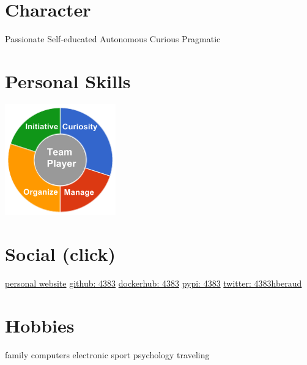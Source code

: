 \documentclass[]{friggeri-cv}
\begin{document}
\begin{aside}
~
~
~
    \section{Character}
        Passionate
        Self-educated
        Autonomous
        Curious
        Pragmatic
        ~
    \section{Personal Skills}
        \includegraphics[scale=0.62]{img/personal.png}
        ~
    \section{Social (click)}
        \href{http://herve.beraud.ovh/}{personal website}
        \href{https://github.com/4383}{github: 4383}
        \href{https://hub.docker.com/r/4383}{dockerhub: 4383}
        \href{https://warehouse.python.org/user/4383/}{pypi: 4383}
        \href{https://twitter.com/4383hberaud}{twitter: 4383hberaud}
        ~
    \section{Hobbies}
        family
        computers
        electronic
        sport
        psychology
        traveling
\end{aside}
\end{document}
